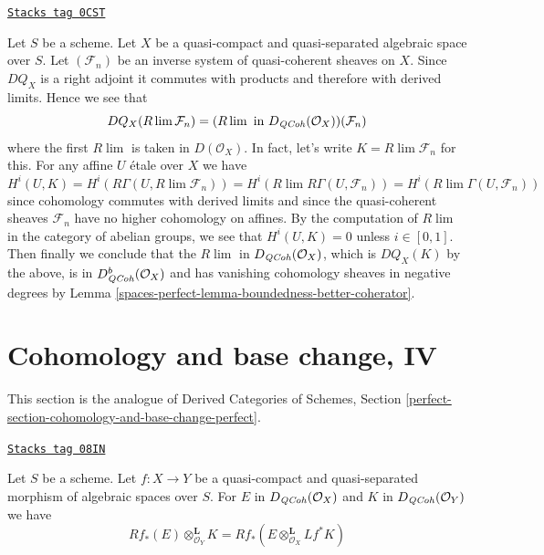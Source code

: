 \begin{example}
\label{spaces-perfect-example-inverse-limit-quasi-coherent}
\href{https://stacks.math.columbia.edu/tag/0CST}{\texttt{Stacks tag 0CST}}

Let $S$ be a scheme.
Let $X$ be a quasi-compact and quasi-separated algebraic space over $S$.
Let $(\mathcal{F}_n)$
be an inverse system of quasi-coherent sheaves on $X$.
Since $DQ_X$ is a right
adjoint it commutes with products and therefore with derived limits.
Hence we see that
$$
DQ_X(R\lim \mathcal{F}_n) =
(R\lim\text{ in }D_{\mathit{QCoh}}(\mathcal{O}_X))(\mathcal{F}_n)
$$
where the first $R\lim$ is taken in $D(\mathcal{O}_X)$.
In fact, let's write $K = R\lim \mathcal{F}_n$ for this.
For any affine $U$ \'etale over $X$ we have
$$
H^i(U, K) =
H^i(R\Gamma(U, R\lim \mathcal{F}_n)) =
H^i(R\lim R\Gamma(U, \mathcal{F}_n)) =
H^i(R\lim \Gamma(U, \mathcal{F}_n))
$$
since cohomology commutes with derived limits and since
the quasi-coherent sheaves
$\mathcal{F}_n$ have no higher cohomology on affines.
By the computation of $R\lim$ in the category of
abelian groups, we see that $H^i(U, K) = 0$
unless $i \in [0, 1]$. Then finally we conclude that
the $R\lim$ in $D_{\mathit{QCoh}}(\mathcal{O}_X)$, which is
$DQ_X(K)$ by the above, is in $D^b_{\mathit{QCoh}}(\mathcal{O}_X)$
and has vanishing cohomology sheaves in negative degrees
by Lemma \ref{spaces-perfect-lemma-boundedness-better-coherator}.
\end{example}

\section{Cohomology and base change, IV}
\label{spaces-perfect-section-cohomology-and-base-change-perfect}
This section is the analogue of Derived Categories of Schemes, Section
\ref{perfect-section-cohomology-and-base-change-perfect}.

\begin{lemma}
\label{spaces-perfect-lemma-cohomology-base-change}
\href{https://stacks.math.columbia.edu/tag/08IN}{\texttt{Stacks tag 08IN}}

Let $S$ be a scheme. Let $f : X \to Y$ be a quasi-compact and quasi-separated
morphism of algebraic spaces over $S$. For $E$ in
$D_{\mathit{QCoh}}(\mathcal{O}_X)$ and
$K$ in $D_{\mathit{QCoh}}(\mathcal{O}_Y)$ we have
$$
Rf_*(E) \otimes_{\mathcal{O}_Y}^\mathbf{L} K =
Rf_*(E \otimes_{\mathcal{O}_X}^\mathbf{L} Lf^*K)
$$
\end{lemma}

